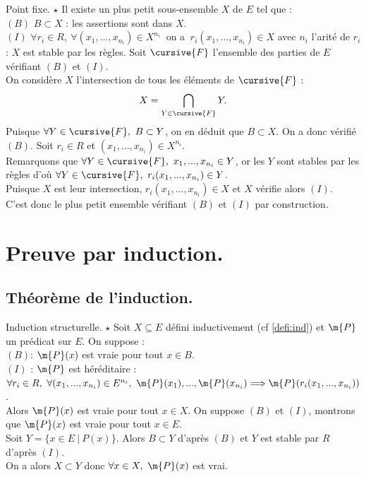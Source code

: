 \documentclass[french, 11pt]{article}
\begin{document}
\begin{thm}{Point fixe. $\star$}{}
    Il existe un plus petit sous-ensemble $X$ de $E$ tel que :\\
    \hspace*{2em}$(B)$ $B \subset X$ : les assertions sont dans $X$.\\
    \hspace*{2em}$(I)$ $\forall r_i \in R, ~ \forall (x_1, ..., x_{n_i}) \in X^{n_i} ~ $ on a $ ~ r_i(x_1,...,x_{n_i})\in X$ avec $n_i$ l'arité de $r_i$ : $X$ est stable par les règles.
    \tcblower
    Soit $\cursive{F}$ l'ensemble des parties de $E$ vérifiant $(B)$ et $(I)$.\\
    On considère $X$ l'intersection de tous les éléments de $\cursive{F}$ :
    \begin{equation*}
        X = \bigcap_{Y\in\cursive{F}}Y.
    \end{equation*}
    Puisque $\forall Y\in \cursive{F}, ~ B\subset Y$, on en déduit que $B \subset X$. On a donc vérifié $(B)$. Soit $r_i\in R$ et $(x_1, ..., x_{n_i})\in X^{n_i}$.\\
    Remarquons que $\forall Y \in \cursive{F}, ~ x_1, ..., x_{n_i} \in Y$, or les $Y$ sont stables par les règles d'où $\forall Y \in \cursive{F}, ~ r_i(x_1, ..., x_{n_i})\in Y$.\\
    Puisque $X$ est leur intersection, $r_i(x_1, ..., x_{n_i})\in X$ et $X$ vérifie alors $(I)$.\\
    C'est donc le plus petit ensemble vérifiant $(B)$ et $(I)$ par construction.
\end{thm}

\section{Preuve par induction.}
\subsection{Théorème de l'induction.}

\begin{thm}{Induction structurelle. $\star$}{}
    Soit $X\subseteq E$ défini inductivement (cf \ref{defi:ind}) et $\m{P}$ un prédicat sur $E$. On suppose :\\
    \hspace*{2em}$(B)$\hspace*{0.025cm}: $\m{P}(x)$ est vraie pour tout $x\in B$.\\
    \hspace*{2em}$(I)$ : $\m{P}$ est héréditaire : $\forall r_i\in R, ~ \forall (x_1,...,x_{n_i})\in E^{n_i}, ~ \m{P}(x_1),...,\m{P}(x_{n_i})\Longrightarrow \m{P}(r_i(x_1, ..., x_{n_i}))$.\\
    Alors $\m{P}(x)$ est vraie pour tout $x\in X$.
    \tcblower
    On suppose $(B)$ et $(I)$, montrons que $\m{P}(x)$ est vraie pour tout $x\in E$.\\
    Soit $Y = \{x\in E ~ | ~ P(x)\}$. Alors $B \subset Y$ d'après $(B)$ et $Y$ est stable par $R$ d'après $(I)$.\\
    On a alors $X \subset Y$ donc $\forall x \in X, ~ \m{P}(x)$ est vrai.
\end{thm}
\end{document}
